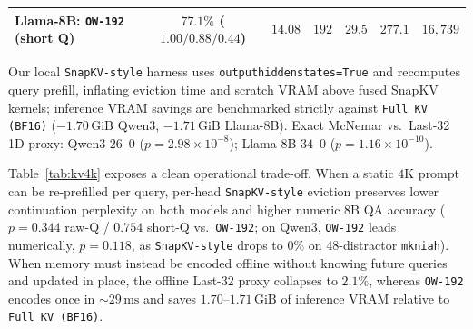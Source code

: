 \documentclass[10pt]{article}
\renewcommand{\_}{\origunderscore\allowbreak}
\begin{document}
\begin{table}[t]
{\begin{tabular}{@{}lcccccc@{}}
\textbf{Llama-8B:} \texttt{OW-192} (short Q) & $77.1\%$ ($1.00/0.88/0.44$) & $14.08$ & $192$ & $29.5$ & $277.1$ & $16{,}739$ \\
\bottomrule
\end{tabular}%
}
\vspace{2pt}
\parbox{\textwidth}{\footnotesize *Our local \texttt{SnapKV-style} harness uses \texttt{output\_hidden\_states=True} and recomputes query prefill, inflating eviction time and scratch VRAM above fused SnapKV kernels; inference VRAM savings are benchmarked strictly against \texttt{Full KV (BF16)} ($-1.70\,\text{GiB}$ Qwen3, $-1.71\,\text{GiB}$ Llama-8B). Exact McNemar vs.\ Last-32 1D proxy: Qwen3 $26$--$0$ ($p=2.98\times 10^{-8}$); Llama-8B $34$--$0$ ($p=1.16\times 10^{-10}$).}
\end{table}

Table~\ref{tab:kv4k} exposes a clean operational trade-off. When a static $4\text{K}$ prompt can be re-prefilled per query, per-head \texttt{SnapKV-style} eviction preserves lower continuation perplexity on both models and higher numeric $8\text{B}$ QA accuracy ($p=0.344$ raw-Q / $0.754$ short-Q vs.\ \texttt{OW-192}; on Qwen3, \texttt{OW-192} leads numerically, $p=0.118$, as \texttt{SnapKV-style} drops to $0\%$ on $48$-distractor \texttt{mk\_niah}). When memory must instead be encoded offline without knowing future queries and updated in place, the offline Last-32 proxy collapses to $2.1\%$, whereas \texttt{OW-192} encodes once in $\sim 29\,\text{ms}$ and saves $1.70$--$1.71\,\text{GiB}$ of inference VRAM relative to \texttt{Full KV (BF16)}.
\end{document}
